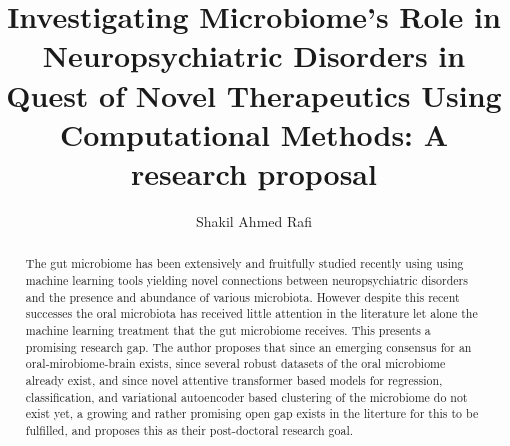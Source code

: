 \documentclass{article}
\title{Investigating Microbiome's Role in Neuropsychiatric Disorders in Quest of Novel Therapeutics Using Computational Methods: A research proposal}
\author{Shakil Ahmed Rafi}
\begin{document}
\maketitle
\begin{abstract}
	The gut microbiome has been extensively and fruitfully studied recently using using machine learning tools yielding novel connections between neuropsychiatric disorders and the presence and abundance of various microbiota. However despite this recent successes the oral microbiota has received little attention in the literature let alone the machine learning treatment that the gut microbiome receives. This presents a promising research gap. The author proposes that since an emerging consensus for an oral-mirobiome-brain exists, since several robust datasets of the oral microbiome already exist, and since novel attentive transformer based models for regression, classification, and variational autoencoder based clustering of the microbiome do not exist yet, a growing and rather promising open gap exists in the literture for this to be fulfilled, and proposes this as their post-doctoral research goal.
\end{abstract}
\noindent
\end{document}
